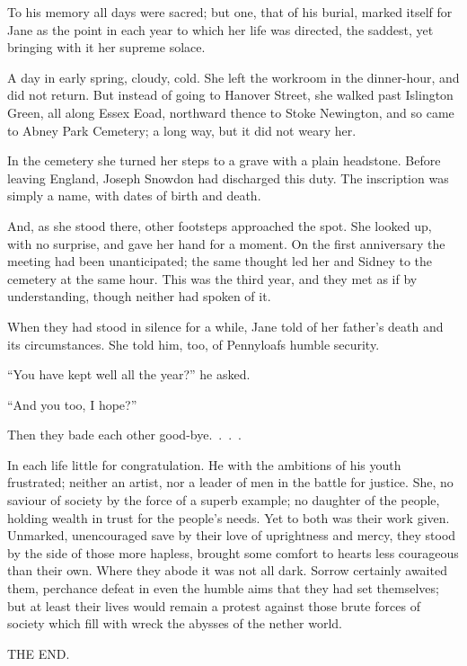 To his memory all days were sacred; but one, that of his burial, marked
itself for Jane as the point in each year to which her life was
directed, the saddest, yet bringing with it her supreme solace.

A day in early spring, cloudy, cold. She left the workroom in the
dinner-hour, and did not return. But instead of going to Hanover Street,
she walked past Islington Green, all {}along Essex Eoad, northward
thence to Stoke Newington, and so came to Abney Park Cemetery; a long
way, but it did not weary her.

In the cemetery she turned her steps to a grave with a plain headstone.
Before leaving England, Joseph Snowdon had discharged this duty. The
inscription was simply a name, with dates of birth and death.

And, as she stood there, other footsteps approached the spot. She looked
up, with no surprise, and gave her hand for a moment. On the first
anniversary the meeting had been unanticipated; the same thought led her
and Sidney to the cemetery at the same hour. This was the third year,
and they met as if by understanding, though neither had spoken of it.

When they had stood in silence for a while, Jane told of her father's
death and its circumstances. She told him, too, of Pennyloafs humble
security.

``You have kept well all the year?'' he asked.

``And you too, I hope?''

Then they bade each other good-bye{.~.~.~.}

In each life little for congratulation. He {}with the ambitions of his
youth frustrated; neither an artist, nor a leader of men in the battle
for justice. She, no saviour of society by the force of a superb
example; no daughter of the people, holding wealth in trust for the
people's needs. Yet to both was their work given. Unmarked, unencouraged
save by their love of uprightness and mercy, they stood by the side of
those more hapless, brought some comfort to hearts less courageous than
their own. Where they abode it was not all dark. Sorrow certainly
awaited them, perchance defeat in even the humble aims that they had set
themselves; but at least their lives would remain a protest against
those brute forces of society which fill with wreck the abysses of the
nether world.

\vfill
\begin{center}
THE END.
\end{center}
